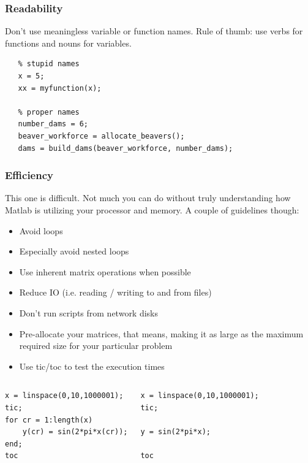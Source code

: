 \begin{frame}[fragile]
  \frametitle{Readability}
  Don’t use meaningless variable or function names. Rule of thumb: use verbs for functions and nouns for variables.
  \vspace*{2em}
  \begin{lstlisting}
   % stupid names
   x = 5;
   xx = myfunction(x);
   
   % proper names
   number_dams = 6;
   beaver_workforce = allocate_beavers();
   dams = build_dams(beaver_workforce, number_dams);
  \end{lstlisting}
\end{frame}

\begin{frame}[fragile]
  \frametitle{Efficiency}
  This one is difficult. Not much you can do without truly understanding how Matlab is utilizing your processor and memory. A couple of guidelines though:
  \begin{itemize}
      \item Avoid loops
      \item Especially avoid nested loops
      \item Use inherent matrix operations when possible
      \item Reduce IO (i.e. reading / writing to and from files)
      \item Don’t run scripts from network disks
      \item Pre-allocate your matrices, that means, making it as large as the maximum required size for your particular problem
      \item Use tic/toc to test the execution times
  \end{itemize}
  \begin{columns}
    \begin{lstlisting}
x = linspace(0,10,1000001);
tic; 
for cr = 1:length(x)
    y(cr) = sin(2*pi*x(cr));
end; 
toc
    \end{lstlisting}
    \begin{lstlisting}
x = linspace(0,10,1000001);
tic; 

y = sin(2*pi*x);

toc
    \end{lstlisting}
  \end{columns}
\end{frame}

